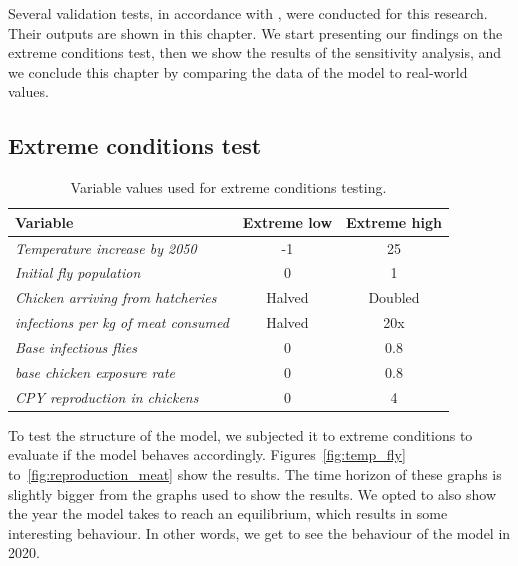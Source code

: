 Several validation tests, in accordance with \cite{forrester_tests_1980}, were conducted for this research. Their outputs are shown in this chapter. We start presenting our findings on the extreme conditions test, then we show the results of the sensitivity analysis, and we conclude this chapter by comparing the data of the model to real-world values.

\subsection{Extreme conditions test}
\label{s:extreme_conditions}


\begin{table}[]
\centering
\begin{tabular}{|l|c|c|}
\hline
\textbf{Variable}                             & \textbf{Extreme low} & \textbf{Extreme high} \\ \hline
\textit{Temperature   increase by 2050}       & -1                   & 25                    \\ \hline
\textit{Initial fly population}               & 0                    & 1                     \\ \hline
\textit{Chicken arriving from   hatcheries}   & Halved               & Doubled               \\ \hline
\textit{infections per kg of meat   consumed} & Halved               & 20x                   \\ \hline
\textit{Base infectious flies}                & 0                    & 0.8                   \\ \hline
\textit{base chicken exposure rate}           & 0                    & 0.8                   \\ \hline
\textit{CPY reproduction in chickens}         & 0                    & 4                     \\ \hline
\end{tabular}
\caption{Variable values used for extreme conditions testing.}
\label{tab:extreme_values}
\end{table}


To test the structure of the model, we subjected it to extreme conditions to evaluate if the model behaves accordingly. Figures~\ref{fig:temp_fly} to~\ref{fig:reproduction_meat} show the results. The time horizon of these graphs is slightly bigger from the graphs used to show the results. We opted to also show the year the model takes to reach an equilibrium, which results in some interesting behaviour. In other words, we get to see the behaviour of the model in 2020.

